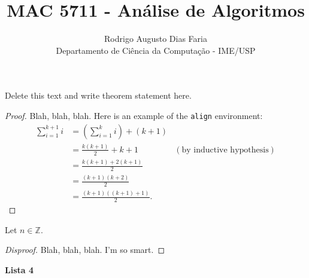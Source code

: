 \documentclass[12pt]{article}
\newcommand{\Z}{\mathbb{Z}}
\newenvironment{theorem}[2][Theorem]{\begin{trivlist}
\item[\hskip \labelsep {\bfseries #1}\hskip \labelsep {\bfseries #2.}]}{\end{trivlist}}
\newenvironment{proposition}[2][Proposition]{\begin{trivlist}
\item[\hskip \labelsep {\bfseries #1}\hskip \labelsep {\bfseries #2.}]}{\end{trivlist}}
\begin{document}
 
 
 
\title{MAC 5711 - Análise de Algoritmos}
\author{Rodrigo Augusto Dias Faria\\
Departamento de Ciência da Computação - IME/USP}
 
\maketitle
 
\begin{theorem}{x.yz} %
Delete this text and write theorem statement here.
\end{theorem}
 
\begin{proof}
Blah, blah, blah.  Here is an example of the \texttt{align} environment:
\begin{align*}
\sum_{i=1}^{k+1}i & = \left(\sum_{i=1}^{k}i\right) +(k+1)\\ 
& = \frac{k(k+1)}{2}+k+1 & (\text{by inductive hypothesis})\\
& = \frac{k(k+1)+2(k+1)}{2}\\
& = \frac{(k+1)(k+2)}{2}\\
& = \frac{(k+1)((k+1)+1)}{2}.
\end{align*}
\end{proof}
 
\begin{proposition}{x.yz}
Let $n\in \Z$.  
\end{proposition}
 
\begin{proof}[Disproof]%
Blah, blah, blah.  I'm so smart.
\end{proof}

\begin{center} 
\textbf{\large{Lista 4}}
\end{center}




\end{document}
